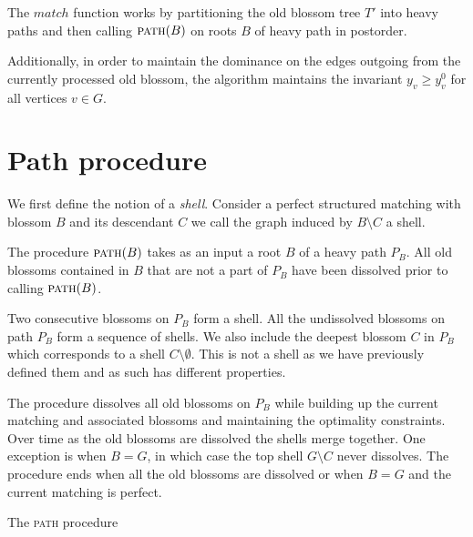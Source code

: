 The $match$ function works by partitioning the old blossom tree $T'$ into heavy paths and then calling $\textsc{path}(B)$ on roots $B$ of heavy path in postorder.

Additionally, in order to maintain the dominance on the edges outgoing from the currently processed old blossom, the algorithm maintains the invariant $y_v \geq y^0_v$ for all vertices $v \in G$.

\section{Path procedure}

We first define the notion of a \textit{shell}. Consider a perfect structured matching with blossom $B$ and its descendant $C$ we call the graph induced by $B \setminus C$ a shell.

The procedure $\textsc{path}(B)$ takes as an input a root $B$ of a heavy path $P_B$. All old blossoms contained in $B$ that are not a part of $P_B$ have been dissolved prior to calling $\textsc{path}(B)$. 

Two consecutive blossoms on $P_B$ form a shell. All the undissolved blossoms on path $P_B$ form a sequence of shells. We also include the deepest blossom $C$ in $P_B$ which corresponds to a shell $C \setminus \emptyset$. This is not a shell as we have previously defined them and as such has different properties. 

The procedure dissolves all old blossoms on $P_B$ while building up the current matching and associated blossoms and maintaining the optimality constraints. Over time as the old blossoms are dissolved the shells merge together. One exception is when $B = G$, in which case the top shell $G \setminus C$ never dissolves. The procedure ends when all the old blossoms are dissolved or when $B = G$ and the current matching is perfect.

\begin{algorithm}
\caption{The \textsc{path} procedure}
\begin{algorithmic}[1]
        \EndIf
    \EndFor
\EndWhile
\EndProcedure
\end{algorithmic}
\end{algorithm}

